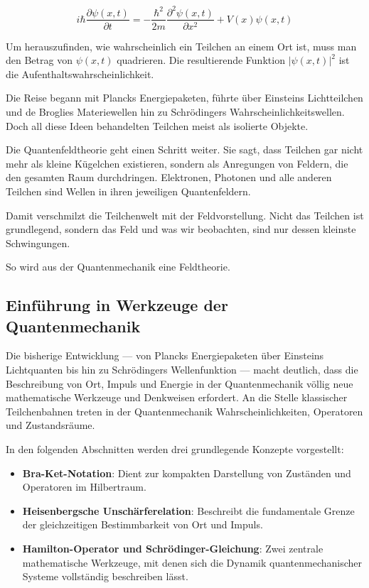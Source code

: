 	\begin{equation}\label{fourier:equation:zeitabhaengigeSchroedingerGleichung}
		i \hbar \frac{\partial \psi(x,t)}{\partial t} = -\frac{\hbar^2}{2m} \frac{\partial^2 \psi(x,t)}{\partial x^2} + V(x) \psi(x,t)
	\end{equation}
	
	
	Um herauszufinden, wie wahrscheinlich ein Teilchen an einem Ort ist, muss man den Betrag von $\psi(x, t)$ quadrieren. 
	Die resultierende Funktion $|\psi(x, t)|^2$ ist die Aufenthaltswahrscheinlichkeit. 
	
	Die Reise begann mit Plancks Energiepaketen, führte über Einsteins Lichtteilchen und de Broglies Materiewellen hin zu Schrödingers Wahrscheinlichkeitswellen. 
	Doch all diese Ideen behandelten Teilchen meist als isolierte Objekte.
	
	Die Quantenfeldtheorie geht einen Schritt weiter.
	Sie sagt, dass Teilchen gar nicht mehr als kleine Kügelchen existieren, sondern als Anregungen von Feldern, die den gesamten Raum durchdringen. 
	Elektronen, Photonen und alle anderen Teilchen sind Wellen in ihren jeweiligen Quantenfeldern.
	
	Damit verschmilzt die Teilchenwelt mit der Feldvorstellung.
	Nicht das Teilchen ist grundlegend, sondern das Feld und was wir beobachten, sind nur dessen kleinste Schwingungen.
	
	So wird aus der Quantenmechanik eine Feldtheorie.

\subsection{Einführung in Werkzeuge der Quantenmechanik\label{fourier:subsection:werkzeugeQuantenmechanik}}
	Die bisherige Entwicklung --- von Plancks Energiepaketen über Einsteins Lichtquanten bis hin zu Schrödingers Wellenfunktion ---
	macht deutlich, dass die Beschreibung von Ort, Impuls und Energie in der Quantenmechanik völlig neue mathematische Werkzeuge und Denkweisen erfordert.
	An die Stelle klassischer Teilchenbahnen treten in der Quantenmechanik Wahrscheinlichkeiten, Operatoren und Zustandsräume.

	In den folgenden Abschnitten werden drei grundlegende Konzepte vorgestellt:
	\begin{itemize}
	\item \textbf{Bra-Ket-Notation}:  
	Dient zur kompakten Darstellung von Zuständen und Operatoren im Hilbertraum.

	\item \textbf{Heisenbergsche Unschärferelation}:  
	Beschreibt die fundamentale Grenze der gleichzeitigen Bestimmbarkeit von Ort und Impuls.

	\item \textbf{Hamilton-Operator und Schrödinger-Gleichung}:  
	Zwei zentrale mathematische Werkzeuge, mit denen sich die Dynamik quantenmechanischer Systeme vollständig beschreiben lässt.
	\end{itemize}

